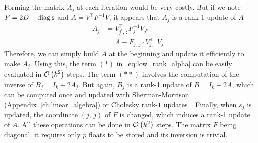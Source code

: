 Forming the matrix $A_j$ at each iteration would be very costly.
But if we note $F = 2D - \operatorname*{diag}\mathbf{s}$ and $A = V^\top F^{-1} V$,
it appears that $A_j$ is a rank-1 update of $A$
\begin{align*}
    A_j &= V_{j^c,\, :}^\top F_j^{-1} V_{j^c,\, :}\\
    &= A - F_{j,\, j} \cdot V_{j,\, :}^\top V_{j,\, :}
\end{align*}
Therefore, we can simply build $A$ at the beginning and update it efficiently to make $A_j$.
Using this, the term $(*)$ in~\ref{eq:low_rank_alpha} can be easily evaluated in $\mathcal{O}\left( k^2 \right)$ steps.
The term $(**)$ involves the computation of the inverse of $B_j = I_k + 2A_j$.
But again, $B_j$ is a rank-1 update of $B = I_k + 2A$,
which can be computed once
and updated with Sherman-Morrison (Appendix~\ref{ch:linear_algebra})
or Cholesky rank-$1$ updates~\citep{cholesky_rank_1}.
Finally, when $s_j$ is updated, the coordinate $(j,\, j)$ of $F$ is changed,
which induces a rank-1 update of $A$.
All these operations can be done in $\mathcal{O}\left( k^2 \right)$ steps.
The matrix $F$ being diagonal,
it requires only $p$ floats to be stored and its inversion is trivial.

